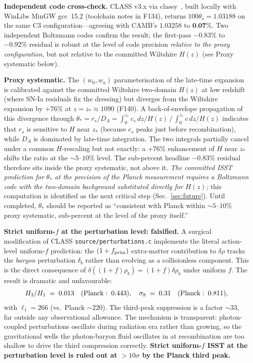 \documentclass[aps,prd,twocolumn,nofootinbib,floatfix,superscriptaddress]{revtex4-2}
\newcommand{\fprim}{f_{\rm prim}}
\begin{document}
\textbf{Independent code cross-check.} CLASS v3.x via
classy~\cite{Lesgourgues2011}, built locally with WinLibs MinGW
gcc~15.2 (toolchain notes in F134), returns $100\theta_s = 1.03188$
on the same C3 configuration---agreeing with CAMB's $1.03258$ to
$\textbf{0.07\%}$. Two independent Boltzmann codes confirm the
result; the first-pass $-0.83\%$ to $-0.92\%$ residual is robust at
the level of code precision \emph{relative to the proxy
configuration}, but not relative to the committed Wiltshire
$H(z)$ (see Proxy systematic below).

\textbf{Proxy systematic.}
The $(w_0, w_a)$ parameterisation of the late-time expansion is
calibrated against the committed Wiltshire two-domain $H(z)$ at
low redshift (where SN-Ia residuals fix the dressing) but diverges
from the Wiltshire expansion by $+76\%$ at $z = z_* \approx 1090$
(F140). A back-of-envelope propagation of this divergence through
$\theta_* = r_s/D_A = \int_0^{z_*}\!c_s\,dz/H(z)\,/\,\int_0^{z_*}\!c\,dz/H(z)$
indicates that $r_s$ is sensitive to $H$ near $z_*$ (because $c_s$
peaks just before recombination), while $D_A$ is dominated by
late-time integration. The two integrals partially cancel under a
common $H$-rescaling but not exactly: a $+76\%$ enhancement of
$H$ near $z_*$ shifts the ratio at the $\sim 5$--$10\%$ level. The
sub-percent headline $-0.83\%$ residual therefore sits inside the
proxy systematic, not above it. \emph{The committed ISST prediction
for $\theta_*$ at the precision of the Planck measurement requires
a Boltzmann code with the two-domain background substituted directly
for $H(z)$;} this computation is identified as the next critical
step (Sec.~\ref{sec:future}). Until completed, $\theta_*$ should
be reported as ``consistent with Planck within $\sim 5$--$10\%$
proxy systematic, sub-percent at the level of the proxy itself.''

\textbf{Strict uniform-$f$ at the perturbation level: falsified.}
A surgical modification of CLASS \texttt{source/perturbations.c}
implements the literal action-level uniform-$f$ prediction: the
$(1+\fprim)$ extra-matter contribution to $\delta\rho$ tracks the
\emph{baryon} perturbation $\delta_b$ rather than evolving as a
collisionless component. This is the direct consequence of
$\delta((1+f)\rho_b) = (1+f)\delta\rho_b$ under uniform $f$. The
result is dramatic and unfavourable:
\begin{equation}
H_3/H_1 \;=\; 0.013\quad{\rm (Planck:\;0.443)},\quad
\sigma_8 \;=\; 0.31\quad{\rm (Planck:\;0.811)},
\end{equation}
with $\ell_1 = 266$ (vs.\ Planck $\sim 220$). The third-peak
suppression is a factor $\sim 33$, far outside any observational
allowance. The mechanism is transparent: photon-coupled
perturbations oscillate during radiation era rather than growing,
so the gravitational wells the photon-baryon fluid oscillates in at
recombination are too shallow to drive the third compression
correctly. \textbf{Strict uniform-$f$ ISST at the perturbation
level is ruled out at $>10\sigma$ by the Planck third peak.}
\end{document}
